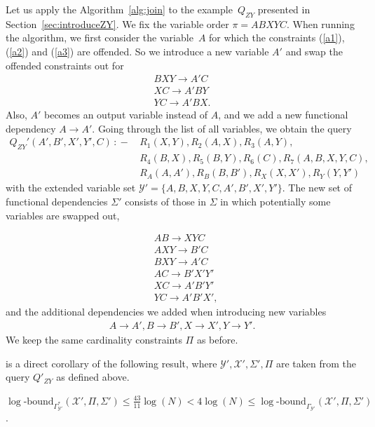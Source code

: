 \documentclass[a4paper,cleveref]{lipics-v2021}
\newcommand{\logb}{\mathrm{\log\text{-}bound}}
\newcommand{\vset}[1]{\mathcal{#1}}
\newcommand{\datarule}{{\,:\!\!-\,}}
\begin{document}
Let us apply the Algorithm~\ref{alg:join} to  the example~$Q_{ZY}$ presented in Section~\ref{sec:introduceZY}.
We fix the variable order $\pi= ABXYC$. When running the algorithm, we first consider the variable~$A$ for which the constraints (\ref{a1}), (\ref{a2}) and (\ref{a3}) are offended. So we introduce a new variable $A'$ and swap the offended constraints out for 
\begin{align*}
	BXY\rightarrow A'C\\
	XC \rightarrow A'BY\\
	YC \rightarrow A'BX.
\end{align*}
Also, $A'$ becomes an output variable instead of $A$, and we add a new functional dependency $A\rightarrow A'$. 
Going through the list of all variables, we obtain the query 
\begin{equation}
\begin{aligned}
Q_{ZY}'(A', B', X', Y', C) \datarule &R_1(X,Y), R_2(A,X), R_3(A,Y),\\ & R_4(B,X), R_5(B,Y), R_6(C), R_7(A,B,X,Y,C),\\
& R_A(A, A'), R_B(B, B'), R_X(X, X'), R_Y(Y, Y') 
\label{eq:basequery-prime}
\end{aligned}
\end{equation}
with the extended variable set $\vset Y'= \{A,B,X,Y,C, A', B', X', Y'\}$.
The new set of functional dependencies $\Sigma'$ consists of those in $\Sigma$ in which potentially some variables are swapped out, 

\begin{equation}
	\begin{split}
	&AB \rightarrow XYC\\
	&AXY \rightarrow B'C\\
	&BXY\rightarrow A'C\\
	&AC \rightarrow B'X'Y'\\
	&XC\rightarrow A'B'Y'\\
	&YC\rightarrow A'B'X',
	\end{split}\label{eq:untangled}
\end{equation}
and the additional dependencies we added when introducing new variables
\begin{align}
	A \rightarrow A', B \rightarrow B', X \rightarrow X', Y \rightarrow Y'.\label{eq:unaryUntangle}
\end{align}
We keep the same cardinality constraints $\Pi$ as before.

 is a direct corollary of the following result, where $\vset Y', \vset X', \Sigma', \Pi$ are taken  from the query $Q'_{ZY}$ as defined above.
\begin{proposition}\label{prop:concretebounds}
	$\logb_{\Gamma^*_{\vset Y'}}(\vset X', \Pi, \Sigma') \le \frac{43}{11 }\log(N)< 4\log(N) \le \logb_{\Gamma_{\vset Y'}}(\vset X', \Pi, \Sigma')$.
\end{proposition}
\end{document}
